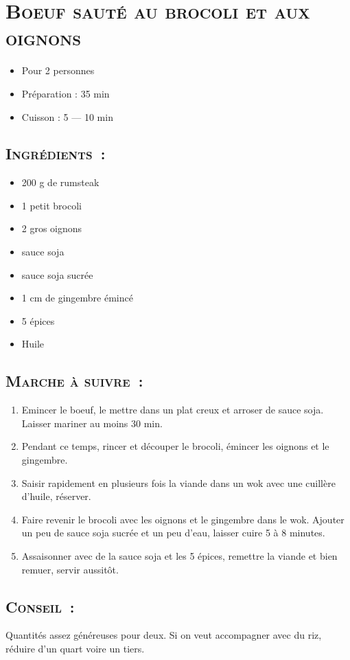 \section[\normalsize{Boeuf saut\'e au brocoli et aux oignons}]{\LARGE{\textsc{Boeuf saut\'e au brocoli et aux oignons}}}		%


\begin{itemize}
\item Pour 2 personnes
\item Préparation : 35 min
\item Cuisson : 5 --- 10 min
\end{itemize}

\subsection*{\textsc{Ingr\'edients~:}}

\begin{itemize}
\item 200 g de rumsteak
\item 1 petit brocoli
\item 2 gros oignons
\item sauce soja
\item sauce soja sucr\'ee
\item 1 cm de gingembre \'eminc\'e
\item 5 \'epices
\item Huile
\end{itemize}


\subsection*{\textsc{Marche \`a suivre~:}}

\begin{enumerate}
\item Emincer le boeuf, le mettre dans un plat creux et arroser de sauce soja. Laisser mariner au moins 30 min.
\item Pendant ce temps, rincer et d\'ecouper le brocoli, \'emincer les oignons et le gingembre.
\item Saisir rapidement en plusieurs fois la viande dans un wok avec une cuill\`ere d'huile, r\'eserver. 
\item Faire revenir le brocoli avec les oignons et le gingembre dans le wok. Ajouter un peu de sauce soja sucr\'ee et un peu d'eau, laisser cuire 5 \`a 8 minutes.
\item Assaisonner avec de la sauce soja et les 5 \'epices, remettre la viande et bien remuer, servir aussitôt.
\end{enumerate}
\subsection*{\textsc{Conseil~:}}
Quantit\'es assez g\'en\'ereuses pour deux. Si on veut accompagner avec du riz, r\'eduire d'un quart voire un tiers.
